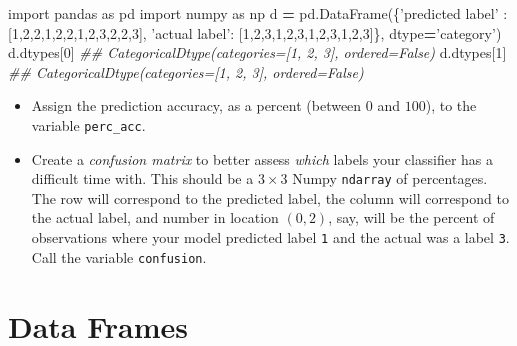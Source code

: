 \documentclass[12pt,krantz2]{krantz}
\makeatletter
\newenvironment{Shaded}{\begin{snugshade}}{\end{snugshade}}
\newcommand{\CommentTok}[1]{\textcolor[rgb]{0.37,0.37,0.37}{\textit{#1}}}
\newcommand{\DecValTok}[1]{\textcolor[rgb]{0.06,0.06,0.06}{#1}}
\newcommand{\ImportTok}[1]{#1}
\newcommand{\NormalTok}[1]{#1}
\newcommand{\OperatorTok}[1]{\textcolor[rgb]{0.43,0.43,0.43}{\textbf{#1}}}
\newcommand{\StringTok}[1]{\textcolor[rgb]{0.5,0.5,0.5}{#1}}
\providecommand{\tightlist}{%
  \setlength{\itemsep}{0pt}\setlength{\parskip}{0pt}}
\newenvironment{kframe}{%
\medskip{}
\setlength{\fboxsep}{.8em}
 \def\at@end@of@kframe{}%
 \ifinner\ifhmode%
  \def\at@end@of@kframe{\end{minipage}}%
  \begin{minipage}{\columnwidth}%
 \fi\fi%
 \def\FrameCommand##1{\hskip\@totalleftmargin \hskip-\fboxsep
 \colorbox{shadecolor}{##1}\hskip-\fboxsep
     \hskip-\linewidth \hskip-\@totalleftmargin \hskip\columnwidth}%
 \MakeFramed {\advance\hsize-\width
   \@totalleftmargin\z@ \linewidth\hsize
   \@setminipage}}%
 {\par\unskip\endMakeFramed%
 \at@end@of@kframe}
\renewenvironment{Shaded}{\begin{kframe}}{\end{kframe}}
\makeatother
\begin{document}
\begin{Shaded}
\begin{Highlighting}[]
\ImportTok{import}\NormalTok{ pandas }\ImportTok{as}\NormalTok{ pd}
\ImportTok{import}\NormalTok{ numpy }\ImportTok{as}\NormalTok{ np}
\NormalTok{d }\OperatorTok{=}\NormalTok{ pd.DataFrame(\{}\StringTok{'predicted label'}\NormalTok{ : [}\DecValTok{1}\NormalTok{,}\DecValTok{2}\NormalTok{,}\DecValTok{2}\NormalTok{,}\DecValTok{1}\NormalTok{,}\DecValTok{2}\NormalTok{,}\DecValTok{2}\NormalTok{,}\DecValTok{1}\NormalTok{,}\DecValTok{2}\NormalTok{,}\DecValTok{3}\NormalTok{,}\DecValTok{2}\NormalTok{,}\DecValTok{2}\NormalTok{,}\DecValTok{3}\NormalTok{], }
                  \StringTok{'actual label'}\NormalTok{: [}\DecValTok{1}\NormalTok{,}\DecValTok{2}\NormalTok{,}\DecValTok{3}\NormalTok{,}\DecValTok{1}\NormalTok{,}\DecValTok{2}\NormalTok{,}\DecValTok{3}\NormalTok{,}\DecValTok{1}\NormalTok{,}\DecValTok{2}\NormalTok{,}\DecValTok{3}\NormalTok{,}\DecValTok{1}\NormalTok{,}\DecValTok{2}\NormalTok{,}\DecValTok{3}\NormalTok{]\}, }
\NormalTok{                  dtype}\OperatorTok{=}\StringTok{'category'}\NormalTok{)}
\NormalTok{d.dtypes[}\DecValTok{0}\NormalTok{]}
\CommentTok{## CategoricalDtype(categories=[1, 2, 3], ordered=False)}
\NormalTok{d.dtypes[}\DecValTok{1}\NormalTok{]}
\CommentTok{## CategoricalDtype(categories=[1, 2, 3], ordered=False)}
\end{Highlighting}
\end{Shaded}

\begin{itemize}
\tightlist
\item
  Assign the prediction accuracy, as a percent (between \(0\) and \(100\)), to the variable \texttt{perc\_acc}.
\item
  Create a \emph{confusion matrix} to better assess \emph{which} labels your classifier has a difficult time with. This should be a \(3 \times 3\) Numpy \texttt{ndarray} of percentages. The row will correspond to the predicted label, the column will correspond to the actual label, and number in location \((0,2)\), say, will be the percent of observations where your model predicted label \texttt{1} and the actual was a label \texttt{3}. Call the variable \texttt{confusion}.
\end{itemize}

\hypertarget{data-frames}{%
\chapter{Data Frames}\label{data-frames}}
\end{document}

